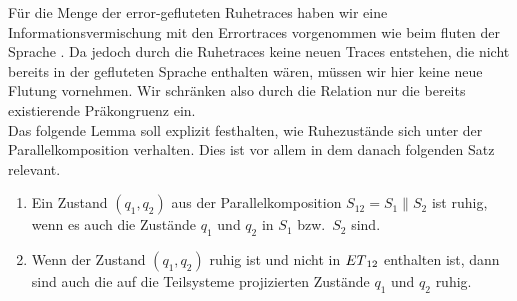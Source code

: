 Für die Menge der error-gefluteten Ruhetraces \QT{} haben wir eine Informationsvermischung
mit den Errortraces vorgenommen wie beim fluten der Sprache \EL{}. Da jedoch
durch die Ruhetraces keine neuen Traces entstehen, die nicht bereits in der
gefluteten Sprache \EL{} enthalten wären, müssen wir hier keine neue Flutung
vornehmen. Wir schränken also durch die Relation \QRel{} nur die
bereits existierende Präkongruenz \ERel{} ein.\\
Das folgende Lemma soll explizit festhalten, wie Ruhezustände sich unter der
Parallelkomposition verhalten. Dies ist vor allem in dem danach folgenden Satz
relevant.

\begin{lem}
  \label{lemRuheParallelkomp}
  \begin{enumerate}
    \item Ein Zustand $(q_1,q_2)$ aus der Parallelkomposition $S_{12}=S_1\|S_2$
      ist ruhig, wenn es auch die Zustände $q_1$ und $q_2$ in $S_1$ bzw.\ $S_2$
      sind.
    \item Wenn der Zustand $(q_1,q_2)$ ruhig ist und nicht in $ET{}_{12}$
      enthalten ist, dann sind auch die auf die Teilsysteme projizierten
      Zustände $q_1$ und $q_2$ ruhig.
  \end{enumerate}
\end{lem}

